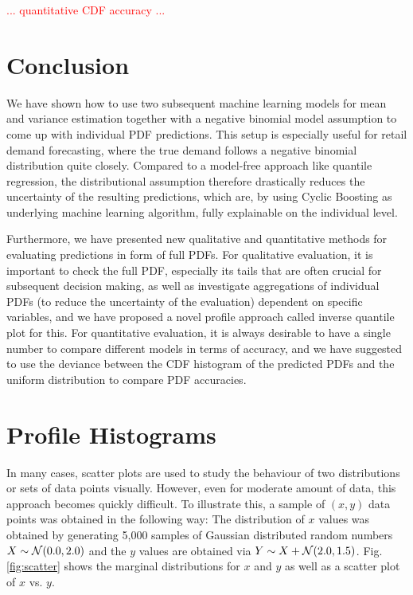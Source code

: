 \documentclass[BCOR=1mm, DIV=calc,10pt,
twoside=true,
twocolumn,
headings=normal]{scrartcl}
\newcommand{\fig}{Fig. }
\begin{document}
\textcolor{red}{... quantitative CDF accuracy ...}


\section{Conclusion}

We have shown how to use two subsequent machine learning models for mean and variance estimation together with a negative binomial model assumption to come up with individual PDF predictions. This setup is especially useful for retail demand forecasting, where the true demand follows a negative binomial distribution quite closely. Compared to a model-free approach like quantile regression, the distributional assumption therefore drastically reduces the uncertainty of the resulting predictions, which are, by using Cyclic Boosting as underlying machine learning algorithm, fully explainable on the individual level. 

Furthermore, we have presented new qualitative and quantitative methods for evaluating predictions in form of full PDFs. For qualitative evaluation, it is important to check the full PDF, especially its tails that are often crucial for subsequent decision making, as well as investigate aggregations of individual PDFs (to reduce the uncertainty of the evaluation) dependent on specific variables, and we have proposed a novel profile approach called inverse quantile plot for this. For quantitative evaluation, it is always desirable to have a single number to compare different models in terms of accuracy, and we have suggested to use the deviance between the CDF histogram of the predicted PDFs and the uniform distribution to compare PDF accuracies.





\appendix

\section{Profile Histograms}

In many cases, scatter plots are used to study the behaviour of two distributions or sets of data points visually. However, even for moderate amount of data, this approach becomes quickly difficult. To illustrate this, a sample of $(x,y)$ data points was obtained in the following way: The distribution of $x$ values was obtained by generating 5,000 samples of Gaussian distributed random numbers $X \sim {\cal N}(0.0,2.0)$ and the $y$ values are obtained via $Y \sim X +  {\cal N}(2.0,1.5)$. \fig \ref{fig:scatter} shows the marginal distributions for $x$ and $y$ as well as a scatter plot of $x$ vs. $y$.
\end{document}

